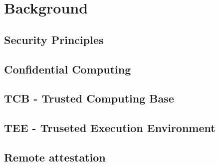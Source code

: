\chapter{Background}
\label{cha:background}


\section{Security Principles}

\section{Confidential Computing}

\section{TCB - Trusted Computing Base}

\section{TEE - Truseted Execution Environment}

\section{Remote attestation}



